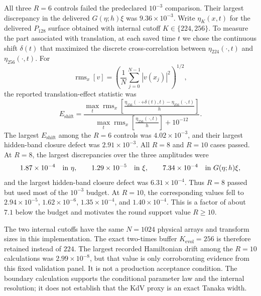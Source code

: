 \documentclass[11pt]{article}
\begin{document}
All three $R=6$ controls failed the predeclared $10^{-3}$ comparison.  Their
largest discrepancy in the delivered $G(\eta;h)\xi$ was
$9.36\times10^{-3}$.  Write $\eta_K(x,t)$ for the delivered $P_{128}$ surface
obtained with internal cutoff $K\in\{224,256\}$.  To measure the part
associated with translation, at each saved time $t$ we chose the continuous
shift $\delta(t)$ that maximized the discrete cross-correlation between
$\eta_{224}(\cdot,t)$ and $\eta_{256}(\cdot,t)$.
For
\[
  \operatorname{rms}_x[v]
  =\left(\frac1N\sum_{j=0}^{N-1}|v(x_j)|^2\right)^{1/2},
\]
the reported translation-effect statistic was
\begin{equation}
  E_{\mathrm{shift}}
  =\frac{
      \displaystyle\max_t\operatorname{rms}_x\!\left[
        \frac{\eta_{256}(\,\cdot+\delta(t),t)
                    -\eta_{256}(\,\cdot,t)}{h}
      \right]
    }{
      \displaystyle\max_t\operatorname{rms}_x\!\left[
        \frac{\eta_{256}(\,\cdot,t)}{h}
      \right]+10^{-12}
    }.
  \label{eq:tanaka-resolution-shift-effect}
\end{equation}
The largest $E_{\mathrm{shift}}$ among the $R=6$ controls was
$4.02\times10^{-3}$, and their largest hidden-band closure defect was
$2.91\times10^{-3}$.  All $R=8$ and $R=10$ cases passed.  At $R=8$, the
largest discrepancies over the three amplitudes were
\begin{equation}
  1.87\times10^{-4}\quad\hbox{in }\eta,
  \qquad 1.29\times10^{-5}\quad\hbox{in }\xi,
  \qquad 7.34\times10^{-4}\quad\hbox{in }G(\eta;h)\xi,
\end{equation}
and the largest hidden-band closure defect was $6.31\times10^{-4}$.  Thus
$R=8$ passed but used most of the $10^{-3}$ budget.  At $R=10$, the
corresponding values fell to $2.94\times10^{-5}$,
$1.62\times10^{-6}$, $1.35\times10^{-4}$, and
$1.40\times10^{-4}$.  This is a factor of about $7.1$ below the budget
and motivates the round support value $R\geq10$.

The two internal cutoffs have the same $N=1024$ physical arrays and transform
sizes in this implementation.  The exact two-times buffer
$K_{\mathrm{evol}}=256$ is therefore retained instead of $224$.  The largest
recorded Hamiltonian drift among the $R=10$ calculations was
$2.99\times10^{-8}$, but that value is only corroborating evidence from this
fixed validation panel.  It is not a production acceptance condition.  The
boundary calculation supports the conditional parameter law and the internal
resolution; it does not establish that the KdV proxy is an exact Tanaka width.
\end{document}
